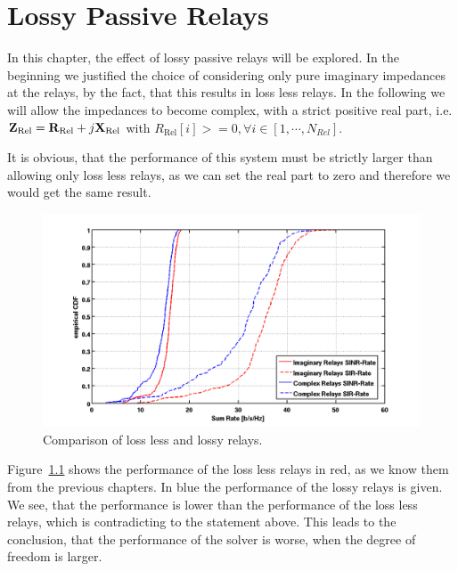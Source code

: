 \chapter{Lossy Passive Relays}
\label{sec:lossyrel}

In this chapter, the effect of lossy passive relays will be explored.
In the beginning we justified the choice of considering only pure imaginary impedances at the relays, by the fact, that this results in loss less relays.
In the following we will allow the impedances to become complex, with a strict positive real part, i.e.
$\mathbf{Z}_\text{Rel} = \mathbf{R}_\text{Rel} + j\mathbf{X}_\text{Rel}$ with $R_\text{Rel}[i]>=0,\forall i\in[1,\cdots,N_{Rel}]$.

It is obvious, that the performance of this system must be strictly larger than allowing only loss less relays, as we can set the real part to zero and therefore we would get the same result.

\begin{figure}[h]
\centering
  \includegraphics[width=\linewidth]{images/Imagvscomp.png}
\caption{Comparison of loss less and lossy relays.}
\label{fig:lossyrel}
\end{figure}

Figure~\ref{fig:lossyrel} shows the performance of the loss less relays in red, as we know them from the previous chapters.
In blue the performance of the lossy relays is given.
We see, that the performance is lower than the performance of the loss less relays, which is contradicting to the statement above.
This leads to the conclusion, that the performance of the solver is worse, when the degree of freedom is larger.


